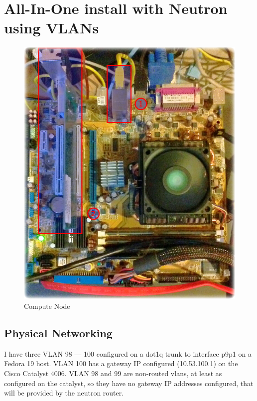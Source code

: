 \documentclass[11pt,letterpaper,oneside]{book}
\begin{document}
\chapter{All-In-One install with Neutron using VLANs}
\begin{figure}
	\caption{Compute Node}
	\centering
	\includegraphics[scale=0.25]{./pictures/motherboard.png}
\end{figure}
\section{Physical Networking}

I have three VLAN 98 --- 100 configured on a dot1q trunk to interface p9p1 on a Fedora 19 host.  VLAN 100 has a gateway IP configured (10.53.100.1) on the Cisco Catalyst 4006.  VLAN 98 and 99 are non-routed vlans, at least as configured on the catalyst, so they have no gateway IP addresses configured, that will be provided by the neutron router.
\end{document}
